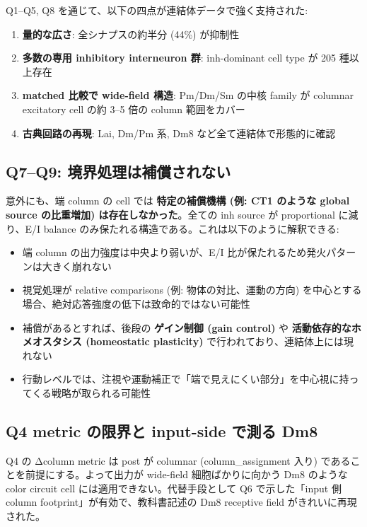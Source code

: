 \documentclass[11pt,a4paper]{ltjsarticle}
\begin{document}
Q1--Q5, Q8 を通じて、以下の四点が連結体データで強く支持された:
\begin{enumerate}
\item \textbf{量的な広さ}: 全シナプスの約半分 (44\%) が抑制性
\item \textbf{多数の専用 inhibitory interneuron 群}: inh-dominant cell type が 205 種以上存在
\item \textbf{matched 比較で wide-field 構造}: Pm/Dm/Sm の中核 family が columnar excitatory cell の約 3--5 倍の column 範囲をカバー
\item \textbf{古典回路の再現}: Lai, Dm/Pm 系, Dm8 など全て連結体で形態的に確認
\end{enumerate}

\subsection{Q7--Q9: 境界処理は補償されない}

意外にも、端 column の cell では \textbf{特定の補償機構 (例: CT1 のような global source の比重増加) は存在しなかった}。全ての inh source が proportional に減り、E/I balance のみ保たれる構造である。これは以下のように解釈できる:

\begin{itemize}
\item 端 column の出力強度は中央より弱いが、E/I 比が保たれるため発火パターンは大きく崩れない
\item 視覚処理が relative comparisons (例: 物体の対比、運動の方向) を中心とする場合、絶対応答強度の低下は致命的ではない可能性
\item 補償があるとすれば、後段の \textbf{ゲイン制御 (gain control)} や \textbf{活動依存的なホメオスタシス (homeostatic plasticity)} で行われており、連結体上には現れない
\item 行動レベルでは、注視や運動補正で「端で見えにくい部分」を中心視に持ってくる戦略が取られる可能性
\end{itemize}

\subsection{Q4 metric の限界と input-side で測る Dm8}

Q4 の Δcolumn metric は post が columnar (column\_assignment 入り) であることを前提にする。よって出力が wide-field 細胞ばかりに向かう Dm8 のような color circuit cell には適用できない。代替手段として Q6 で示した「input 側 column footprint」が有効で、教科書記述の Dm8 receptive field がきれいに再現された。
\end{document}
